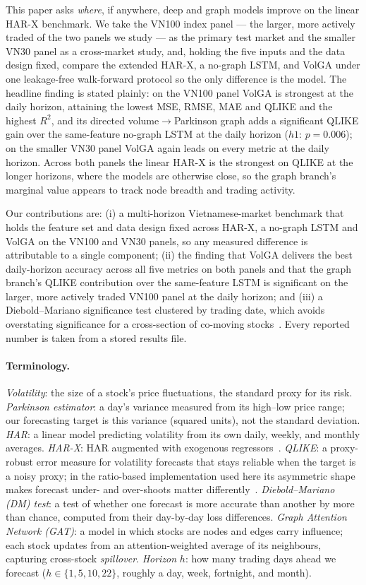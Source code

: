 \documentclass{llncs}
\begin{document}
This paper asks \emph{where}, if anywhere, deep and graph models improve on the linear HAR-X
benchmark. We take the VN100 index panel --- the larger, more actively traded of the
two panels we study --- as the primary test market and the smaller VN30 panel as a cross-market
study, and, holding the five inputs and the data design fixed, compare the extended HAR-X, a no-graph
LSTM, and VolGA under one leakage-free walk-forward protocol so the only difference is the model. The
headline finding is stated plainly: on the VN100 panel VolGA is strongest at the daily horizon,
attaining the lowest MSE, RMSE, MAE and QLIKE and the highest $R^2$, and its directed
volume$\to$Parkinson graph adds a significant QLIKE gain over the same-feature no-graph LSTM at the
daily horizon ($h1$: $p=0.006$); on the smaller VN30 panel VolGA again leads on every metric at the
daily horizon. Across both panels the linear HAR-X is the
strongest on QLIKE at the longer horizons, where the models are otherwise close, so the graph branch's
marginal value appears to track node breadth and trading activity.

Our contributions are: (i) a multi-horizon Vietnamese-market benchmark that holds the feature set
and data design fixed across HAR-X, a no-graph LSTM and VolGA on the VN100 and VN30 panels, so
any measured difference is attributable to a single component; (ii) the finding that VolGA delivers
the best daily-horizon accuracy across all five metrics on both panels and that the graph branch's
QLIKE contribution over the same-feature LSTM is significant on the larger, more actively traded VN100
panel at the daily horizon; and (iii) a Diebold--Mariano significance test clustered by trading date, which
avoids overstating significance for a cross-section of co-moving stocks~\cite{petersen2009}. Every reported number is taken from a stored results file.

\paragraph{Terminology.}
\emph{Volatility}: the size of a stock's price fluctuations, the standard proxy for its risk.
\emph{Parkinson estimator}: a day's variance measured from its high--low price range; our
forecasting target is this variance (squared units), not the standard deviation.
\emph{HAR}: a linear model predicting volatility from its own daily, weekly, and monthly averages.
\emph{HAR-X}: HAR augmented with exogenous regressors~\cite{corsi2009,clements2024}.
\emph{QLIKE}: a proxy-robust error measure for volatility forecasts that stays reliable when the
target is a noisy proxy; in the ratio-based implementation used here its asymmetric shape makes
forecast under- and over-shoots matter differently~\cite{patton2011}.
\emph{Diebold--Mariano (DM) test}: a test of whether one forecast is more accurate than another by
more than chance, computed from their day-by-day loss differences.
\emph{Graph Attention Network (GAT)}: a model in which stocks are nodes and edges carry influence;
each stock updates from an attention-weighted average of its neighbours, capturing cross-stock
\emph{spillover}.
\emph{Horizon} $h$: how many trading days ahead we forecast ($h\in\{1,5,10,22\}$, roughly a day,
week, fortnight, and month).
\end{document}
